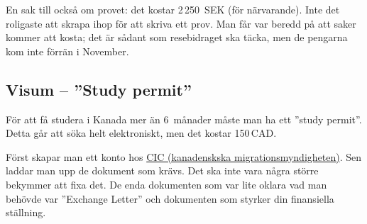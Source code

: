 \documentclass[11pt,a4paper, english, swedish]{article}
\begin{document}
En sak till också om provet: det kostar 2\,250~SEK (för
närvarande). Inte det roligaste att skrapa ihop för att skriva ett
prov. Man får var beredd på att saker kommer att kosta; det är sådant
som resebidraget ska täcka, men de pengarna kom inte förrän i
November.







\subsection{Visum -- ''Study permit''}
För att få studera i Kanada mer än 6~månader måste man ha ett ''study
permit''. Detta går att söka helt elektroniskt, men det kostar 150\,CAD.

Först skapar man ett konto hos
\href{http://www.cic.gc.ca/english/information/applications/student.asp}{CIC
(kanadenskska migrationsmyndigheten)}. Sen laddar man upp de dokument
som krävs. Det ska inte vara några större bekymmer att fixa det.
De enda dokumenten som var lite oklara vad man behövde var ''Exchange
Letter'' och dokumenten som styrker din finansiella ställning.
\end{document}
